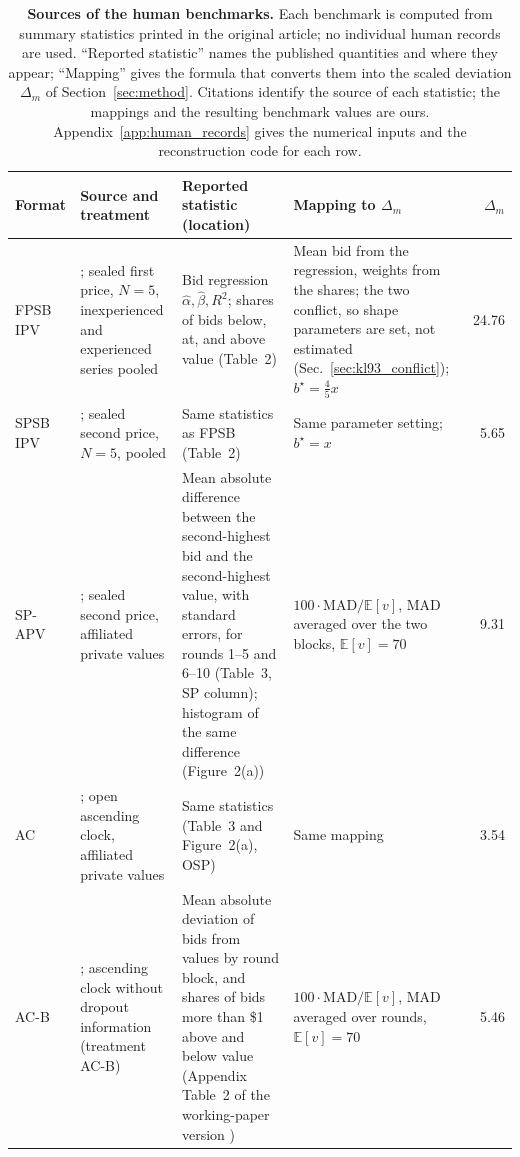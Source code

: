 \begin{table}[tbp]
  \centering\color{blue}%
  \scriptsize
  \caption{\textbf{Sources of the human benchmarks.} Each benchmark is computed from summary statistics printed in the original article; no individual human records are used. ``Reported statistic'' names the published quantities and where they appear; ``Mapping'' gives the formula that converts them into the scaled deviation $\Delta_m$ of Section~\ref{sec:method}. Citations identify the source of each statistic; the mappings and the resulting benchmark values are ours. Appendix~\ref{app:human_records} gives the numerical inputs and the reconstruction code for each row.}
  \label{tab:human_sources}
  \setlength{\tabcolsep}{3pt}
  \begin{tabular}{@{}p{}p{}p{}p{}r@{}}
    \toprule
    Format & Source and treatment & Reported statistic (location) & Mapping to $\Delta_m$ & $\Delta_m$ \\
    \midrule
    FPSB IPV & \citet{kagel1993independent}; sealed first price, $N=5$, inexperienced and experienced series pooled & Bid regression $\hat\alpha,\hat\beta,R^2$; shares of bids below, at, and above value (Table~2) & Mean bid from the regression, weights from the shares; the two conflict, so shape parameters are set, not estimated (Sec.~\ref{sec:kl93_conflict}); $b^\star=\tfrac{4}{5}x$ & 24.76 \\
    SPSB IPV & \citet{kagel1993independent}; sealed second price, $N=5$, pooled & Same statistics as FPSB (Table~2) & Same parameter setting; $b^\star=x$ & 5.65 \\
    SP-APV & \citet{li2017obviously}; sealed second price, affiliated private values & Mean absolute difference between the second-highest bid and the second-highest value, with standard errors, for rounds 1--5 and 6--10 (Table~3, SP column); histogram of the same difference (Figure~2(a)) & $100\cdot\mathrm{MAD}/\mathbb{E}[v]$, MAD averaged over the two blocks, $\mathbb{E}[v]=70$ & 9.31 \\
    AC & \citet{li2017obviously}; open ascending clock, affiliated private values & Same statistics (Table~3 and Figure~2(a), OSP) & Same mapping & 3.54 \\
    AC-B & \citet{breitmoser2022obviousness}; ascending clock without dropout information (treatment AC-B) & Mean absolute deviation of bids from values by round block, and shares of bids more than \$1 above and below value (Appendix Table~2 of the working-paper version \citep{breitmoser2019obviousness}) & $100\cdot\mathrm{MAD}/\mathbb{E}[v]$, MAD averaged over rounds, $\mathbb{E}[v]=70$ & 5.46 \\

\end{tabular}
\end{table}
